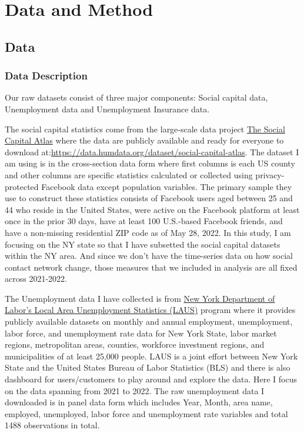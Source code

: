\documentclass{article}
\begin{document}
\section{Data and Method}

\subsection{Data}

\subsubsection{Data Description}

Our raw datasets consist of three major components: Social capital data, Unemployment data and Unemployment Insurance data.


The social capital statistics come from the large-scale data project \href{https://socialcapital.org}{The Social Capital Atlas} where the data are publicly available and ready for everyone to download at:\url{https://data.humdata.org/dataset/social-capital-atlas}. The dataset I am using is in the cross-section data form where first columns is each US county and other columns are specific statistics calculated or collected using privacy-protected Facebook data except population variables. The primary sample they use to construct these statistics consists of Facebook users aged between 25 and 44 who reside in the United States, were active on the Facebook platform at least once in the prior 30 days, have at least 100 U.S.-based Facebook friends, and have a non-missing residential ZIP code as of May 28, 2022. In this study, I am focusing on the NY state so that I have subsetted the social capital datasets within the NY area. And since we don't have the time-series data on how social contact network change, those measures that we included in analysis are all fixed across 2021-2022.

The Unemployment data I have collected is from \href{https://dol.ny.gov/local-area-unemployment-statistics}{New York Department of Labor's Local Area Unemployment Statistics (LAUS)} program where it provides publicly available datasets on monthly and annual employment, unemployment, labor force, and unemployment rate data for New York State, labor market regions, metropolitan areas, counties, workforce investment regions, and municipalities of at least 25,000 people. LAUS is a joint effort between New York State and the United States Bureau of Labor Statistics (BLS) and there is also dashboard for users/customers to play around and explore the data. Here I focus on the data spanning from 2021 to 2022. The raw unemployment data I downloaded is in panel data form which includes Year, Month, area name, employed, unemployed, labor force and unemployment rate variables and total 1488 observations in total. 
\end{document}
